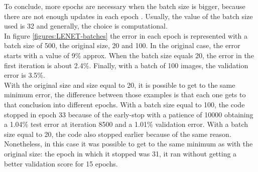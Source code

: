 To conclude, more epochs are necessary when the batch size is bigger, because there are not enough updates in each epoch \cite{Yoshua}. Usually, the value of the batch size used is 32 \cite{Yoshua} and generally, the choice is computational.\\

In figure \ref{figures:LENET-batches} the error in each epoch is represented  with a batch size of 500, the original size, 20 and 100. In the original case, the error starts with a value of 9\% approx. When the batch size equals 20, the error in the first iteration is about 2.4\%. Finally, with a batch of 100 images, the validation error is 3.5\%.\\

With the original size and size equal to 20, it is possible to get to the same minimum error, the difference between those examples is that each one gets to that conclusion into different epochs. With a batch size equal to 100, the code stopped in epoch 33 because of the early-stop with a patience of 10000 obtaining a 1.04\% test error at iteration 8500 and a 1.01\% validation error. With a batch size equal to 20, the code also  stopped earlier because of the same reason. Nonetheless, in this case it was possible to get to the same minimum as with the original size: the epoch in which it stopped was 31, it ran without getting a better validation score for 15 epochs.


